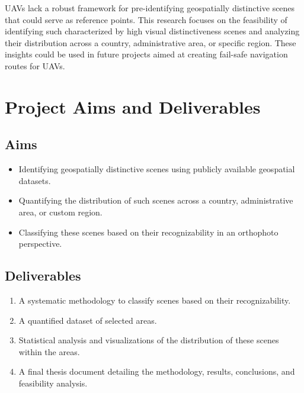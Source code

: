 \documentclass[12pt]{article}
\begin{document}
UAVs lack a robust framework for pre-identifying geospatially distinctive scenes that could serve as reference points. This research focuses on the feasibility of identifying such characterized by high visual distinctiveness scenes and analyzing their distribution across a country, administrative area, or specific region. These insights could be used in future projects aimed at creating fail-safe navigation routes for UAVs.

\section*{Project Aims and Deliverables}
\subsection*{Aims}
\begin{itemize}
    \item     Identifying geospatially distinctive scenes using publicly available geospatial datasets.
    \item Quantifying the distribution of such scenes across a country, administrative area, or custom region.
    \item Classifying these scenes based on their recognizability in an orthophoto perspective.
\end{itemize}

\subsection*{Deliverables}
\begin{enumerate}
    \item  A systematic methodology to classify scenes based on their recognizability.
    \item A quantified dataset of selected areas.
    \item Statistical analysis and visualizations of the distribution of these scenes within the areas.
    \item A final thesis document detailing the methodology, results, conclusions, and feasibility analysis.
\end{enumerate}
\end{document}
